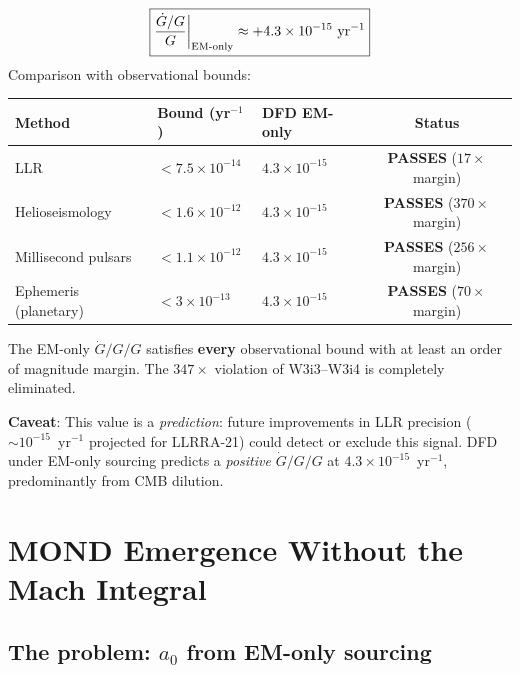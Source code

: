 \documentclass[11pt]{article}
\newcommand{\ee}[1]{\times 10^{#1}}
\newcommand{\Gdot}{\dot{G}/G}
\begin{document}
\begin{tcolorbox}[colback=green!5!white, colframe=green!60!black,
  title=\textbf{T1 RESOLVED: EM-Only $\Gdot/G$ Satisfies All Bounds}]
\begin{equation}
\boxed{\frac{\Gdot}{G}\bigg|_{\rm EM\text{-}only} \approx +4.3\ee{-15}~\text{yr}^{-1}}
\end{equation}
Comparison with observational bounds:
\begin{center}
\begin{tabular}{lllc}
\toprule
Method & Bound (yr$^{-1}$) & DFD EM-only & Status \\
\midrule
LLR & $< 7.5\ee{-14}$ & $4.3\ee{-15}$ & \textcolor{green!50!black}{\textbf{PASSES} ($17\times$ margin)} \\
Helioseismology & $< 1.6\ee{-12}$ & $4.3\ee{-15}$ & \textcolor{green!50!black}{\textbf{PASSES} ($370\times$ margin)} \\
Millisecond pulsars & $< 1.1\ee{-12}$ & $4.3\ee{-15}$ & \textcolor{green!50!black}{\textbf{PASSES} ($256\times$ margin)} \\
Ephemeris (planetary) & $< 3\ee{-13}$ & $4.3\ee{-15}$ & \textcolor{green!50!black}{\textbf{PASSES} ($70\times$ margin)} \\
\bottomrule
\end{tabular}
\end{center}
The EM-only $\Gdot/G$ satisfies \textbf{every} observational bound with
at least an order of magnitude margin. The $347\times$ violation of W3i3--W3i4
is completely eliminated.

\textbf{Caveat}: This value is a \emph{prediction}: future improvements in
LLR precision ($\sim 10^{-15}$~yr$^{-1}$ projected for LLRRA-21) could
detect or exclude this signal. DFD under EM-only sourcing predicts a
\emph{positive} $\Gdot/G$ at $4.3\ee{-15}$~yr$^{-1}$, predominantly
from CMB dilution.
\end{tcolorbox}

\section{MOND Emergence Without the Mach Integral}
\label{sec:MOND-EM}

\subsection{The problem: $a_0$ from EM-only sourcing}
\end{document}
